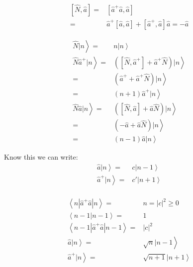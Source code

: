 	\begin{align}
		\left[\hat{N}, \hat{a}\right] =& \left[\hat{a}^+\hat{a}, \hat{a}\right]\\
		 =& \hat{a}^+\left[\hat{a}, \hat{a}\right]+\left[\hat{a}^+, \hat{a}\right]\hat{a} = -\hat{a}
	\end{align}
	
	\begin{align}
		\left. \hat{N} | n \right\rangle =& \left. n | n \right\rangle \\
		\left. \hat{N}\hat{a}^+ | n \right\rangle =& \left. \left(\left[\hat{N}, \hat{a}^+\right] + \hat{a}^+\hat{N}\right)|n\right\rangle\\ 
		=& \left. \left(\hat{a}^+ + \hat{a}^+\hat{N}\right)|n\right\rangle\\ 
		=& \left.\left(n+1\right)\hat{a}^+|n\right\rangle \\
		\left. \hat{N}\hat{a} | n \right\rangle =& \left. \left(\left[\hat{N}, \hat{a}\right] + \hat{a}\hat{N}\right)|n\right\rangle\\ 
		=& \left. \left(-\hat{a} + \hat{a}\hat{N}\right)|n\right\rangle\\ 
		=& \left.\left(n-1\right)\hat{a}|n\right\rangle		
	\end{align}

	Know this we can write:
	\begin{align}
		\left. \hat{a}|n\right\rangle =& \left. c | n-1 \right\rangle \\
		\left. \hat{a}^+|n\right\rangle =& \left. c' | n+1 \right\rangle \\		
	\end{align}

	\begin{align}
		\left\langle n | \hat{a}^+\hat{a} | n \right\rangle =& n = |c|^2 \geq 0 \\
		\left\langle n - 1 | n - 1 \right\rangle =& 1 \\
		\left\langle n - 1 | \hat{a}^+\hat{a} | n - 1 \right\rangle =& |c|^2 \\	
		\left. \hat{a} | n \right\rangle =& \left.\sqrt{n}|n-1\right\rangle \\
		\left. \hat{a}^+| n \right\rangle =& \left.\sqrt{n+1}|n+1\right\rangle \\		
	\end{align}


